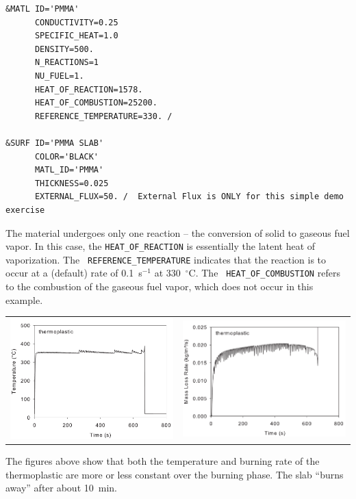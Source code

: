 \documentclass[11pt]{book}
\newcommand{\ct}{\tt\small}
\begin{document}
\scriptsize
\begin{verbatim}
&MATL ID='PMMA'
      CONDUCTIVITY=0.25
      SPECIFIC_HEAT=1.0
      DENSITY=500.
      N_REACTIONS=1
      NU_FUEL=1.
      HEAT_OF_REACTION=1578.
      HEAT_OF_COMBUSTION=25200.
      REFERENCE_TEMPERATURE=330. /

&SURF ID='PMMA SLAB'
      COLOR='BLACK'
      MATL_ID='PMMA'
      THICKNESS=0.025
      EXTERNAL_FLUX=50. /  External Flux is ONLY for this simple demo exercise
\end{verbatim} \normalsize

\noindent
The material undergoes only one reaction -- the conversion of solid to
gaseous fuel vapor. In this case, the {\ct HEAT\_OF\_REACTION} is
essentially the latent heat of vaporization. The {\ct
REFERENCE\_TEMPERATURE} indicates that the reaction is to occur at a
(default) rate of 0.1~s$^{-1}$ at 330~$^\circ$C. The {\ct
HEAT\_OF\_COMBUSTION} refers to the combustion of the gaseous fuel
vapor, which does not occur in this example.

\noindent
\begin{tabular*}{\textwidth}{lr}
\includegraphics[width=3.2in]{FIGURES/thermoplastic_Surface_Temperature} &
\includegraphics[width=3.2in]{FIGURES/thermoplastic_Burning_Rate}
\end{tabular*}

The figures above show that both the temperature and burning rate of the thermoplastic are more or less constant over
the burning phase. The slab ``burns away'' after about 10~min.
\end{document}

